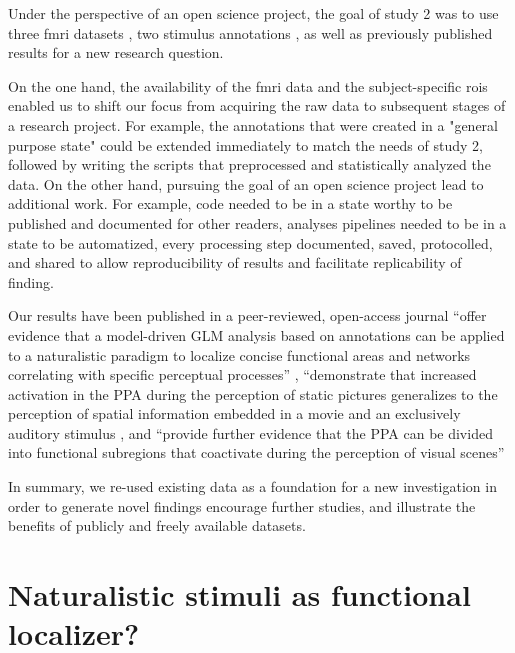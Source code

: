 Under the perspective of an open science project, the goal of study 2 was to use
three \ac{fmri} datasets \citep{hanke2014audiomovie, hanke2016simultaneous,
sengupta2016extension}, two stimulus annotations \citep{haeusler2021speechanno,
haeusler2016cutanno}, as well as previously published results
\citep{sengupta2016extension} for a new research question.


On the one hand, the availability of the \ac{fmri} data and the subject-specific
\acp{roi} enabled us to shift our focus from acquiring the raw data to
subsequent stages of a research project.
For example, the annotations that were created in a "general purpose state"
could be extended immediately to match the needs of study 2, followed by writing
the scripts that preprocessed and statistically analyzed the data.
On the other hand, pursuing the goal of an open science project lead to
additional work.
For example, code needed to be in a state worthy to be published and documented
for other readers, analyses pipelines needed to be in a state to be automatized,
every processing step documented, saved, protocolled, and shared to allow
reproducibility of results and facilitate replicability of finding.


Our results have been published in a peer-reviewed, open-access journal
%
``offer evidence that a model-driven GLM analysis based on annotations can be
applied to a naturalistic paradigm to localize concise functional areas and
networks correlating with specific perceptual processes''
\citep{haeusler2022processing},
%
``demonstrate that increased activation in the PPA during the perception of
static pictures generalizes to the perception of spatial information embedded in
a movie and an exclusively auditory stimulus \citep{haeusler2022processing}, and
%
``provide further evidence that the PPA can be divided into functional
subregions that coactivate during the perception of visual scenes''
\citep{haeusler2022processing}

In summary, we re-used existing data as a foundation for a new investigation in
order to generate novel findings encourage further studies, and illustrate the
benefits of publicly and freely available datasets.




\section{Naturalistic stimuli as functional localizer?}

